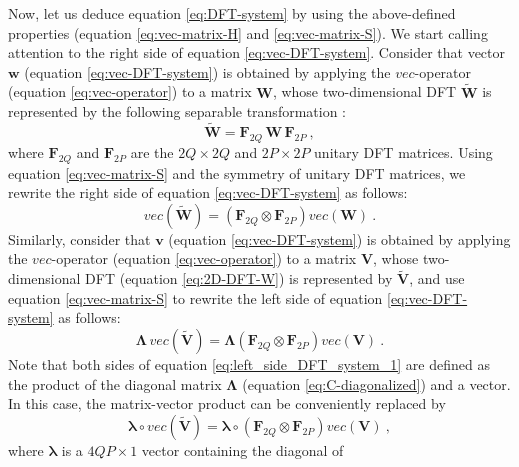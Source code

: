 \documentclass[manuscript,revised]{geophysics}
\begin{document}
Now, let us deduce equation \ref{eq:DFT-system} by 
using the above-defined properties (equation \ref{eq:vec-matrix-H}
and \ref{eq:vec-matrix-S}).
We start calling attention to the right side of equation \ref{eq:vec-DFT-system}.
Consider that vector $\mathbf{w}$ (equation \ref{eq:vec-DFT-system}) 
is obtained by applying the $vec$-operator (equation \ref{eq:vec-operator}) to a matrix 
$\mathbf{W}$, whose two-dimensional DFT $\tilde{\mathbf{W}}$ is represented by the 
following separable transformation \citep[][ p. 146]{jain1989}:
\begin{equation}
\tilde{\mathbf{W}} = \mathbf{F}_{2Q} \, \mathbf{W} \, \mathbf{F}_{2P} \: ,
\label{eq:2D-DFT-W}
\end{equation}
where $\mathbf{F}_{2Q}$ and $\mathbf{F}_{2P}$ are the $2Q \times 2Q$ and $2P \times 2P$ 
unitary DFT matrices. 
Using equation \ref{eq:vec-matrix-S} and the symmetry of unitary DFT 
matrices, we rewrite the right side of equation \ref{eq:vec-DFT-system} 
as follows:
\begin{equation}
vec \left( \tilde{\mathbf{W}} \right) = 
\left( \mathbf{F}_{2Q} \otimes \mathbf{F}_{2P} \right) 
vec \left( \mathbf{W} \right) \: .
\label{eq:right_side_DFT_system_1}
\end{equation}
Similarly, consider that $\mathbf{v}$ (equation \ref{eq:vec-DFT-system}) 
is obtained by applying the $vec$-operator (equation \ref{eq:vec-operator}) to a matrix 
$\mathbf{V}$, whose two-dimensional DFT (equation \ref{eq:2D-DFT-W}) is 
represented by $\tilde{\mathbf{V}}$, and use
equation \ref{eq:vec-matrix-S} to rewrite the 
left side of equation \ref{eq:vec-DFT-system} as follows:
\begin{equation}
\boldsymbol{\Lambda} \, vec \left( \tilde{\mathbf{V}} \right) = 
\boldsymbol{\Lambda}
\left( \mathbf{F}_{2Q} \otimes \mathbf{F}_{2P} \right) 
vec \left( \mathbf{V} \right) \: .
\label{eq:left_side_DFT_system_1}
\end{equation}
Note that both sides of equation \ref{eq:left_side_DFT_system_1}
are defined as the product of the diagonal matrix $\boldsymbol{\Lambda}$ (equation \ref{eq:C-diagonalized}) 
and a vector. In this case, the matrix-vector product can be conveniently replaced by
\begin{equation}
\boldsymbol{\lambda} \circ vec \left( \tilde{\mathbf{V}} \right) = 
\boldsymbol{\lambda} \circ
\left( \mathbf{F}_{2Q} \otimes \mathbf{F}_{2P} \right) 
vec \left( \mathbf{V} \right) \: ,
\label{eq:left_side_DFT_system_2}
\end{equation}
where $\boldsymbol{\lambda}$ is a $4QP \times 1$ vector containing the diagonal of 
\end{document}
